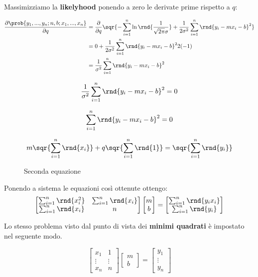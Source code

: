 \documentclass[\main/main.tex]{subfiles}
\begin{document}
Massimizziamo la \textbf{likelyhood} ponendo a zero le derivate prime rispetto a $q$:

\begin{align*}
  \frac{\partial \prob{y_1,...,y_n; n, b; x_1, ..., x_n }}{\partial q} & = \frac{\partial}{\partial q} \sqr{ - \sum_{i=1}^n \ln
    \rnd{ \frac{1}{\sqrt{2\pi}\sigma} }
    + \frac{1}{2\sigma^2} \sum_{i=1}^n
    \rnd{y_i - mx_i - b }^2
  }                                                                                                                                            \\
                                                                       & = 0 + \frac{1}{2\sigma^2} \sum_{i=1}^n \rnd{y_i - mx_i - b }^2 2 (-1) \\
                                                                       & = \frac{1}{\sigma^2} \sum_{i=1}^n \rnd{y_i - mx_i - b }^2
\end{align*}

\[
  \frac{1}{\sigma^2} \sum_{i=1}^n \rnd{y_i - mx_i - b }^2  = 0
\]

\[
  \sum_{i=1}^n \rnd{y_i - mx_i - b }^2 = 0
\]

\begin{figure}[H]
  \[
    m\sqr{ \sum_{i=1}^n \rnd{x_i } } + q \sqr{ \sum_{i=1}^n \rnd{1 } } = \sqr{ \sum_{i=1}^n \rnd{y_i } }
  \]
  \caption{Seconda equazione}
\end{figure}

Ponendo a sistema le equazioni così ottenute ottengo:
\[
  \begin{bmatrix}
    \sum_{i=1}^n \rnd{x_i^2 } & \sum_{i=1}^n \rnd{x_i } \\
    \sum_{i=1}^n \rnd{x_i }   & n
  \end{bmatrix}
  \begin{bmatrix}
    m \\
    b
  \end{bmatrix}
  =
  \begin{bmatrix}
    \sum_{i=1}^n \rnd{y_i x_i } \\
    \sum_{i=1}^n \rnd{y_i }
  \end{bmatrix}
\]

Lo stesso problema visto dal punto di vista dei \textbf{minimi quadrati} è impostato nel seguente modo.

\[
  \begin{bmatrix}
    x_1    & 1      \\
    \vdots & \vdots \\
    x_n    & n
  \end{bmatrix}
  \begin{bmatrix}
    m \\
    b
  \end{bmatrix}
  =
  \begin{bmatrix}
    y_1    \\
    \vdots \\
    y_n
  \end{bmatrix}
\]
\end{document}
